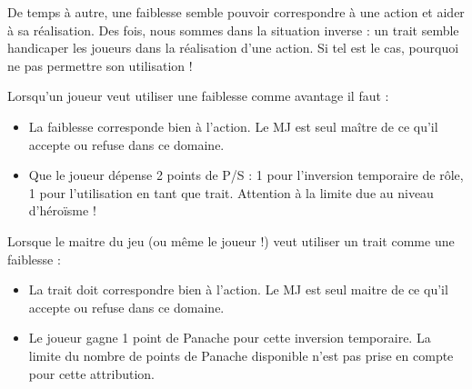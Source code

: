 {
    De temps à autre, une faiblesse semble pouvoir correspondre à une action et aider à sa réalisation. Des fois, nous sommes dans la situation inverse : un trait semble handicaper les joueurs dans la réalisation d'une action. Si tel est le cas, pourquoi ne pas permettre son utilisation !
	
	Lorsqu'un joueur veut utiliser une faiblesse comme avantage il faut :
	\begin{itemize}
		\item La faiblesse corresponde bien à l'action. Le MJ est seul maître de ce qu'il accepte ou refuse dans ce domaine.
		\item Que le joueur dépense 2 points de P/S : 1 pour l'inversion temporaire de rôle, 1 pour l'utilisation en tant que trait. Attention à la limite due au niveau d'héroïsme !
	\end{itemize}
	
	Lorsque le maitre du jeu (ou même le joueur !) veut utiliser un trait comme une faiblesse :
	\begin{itemize}
		\item La trait doit correspondre bien à l'action. Le MJ est seul maitre de ce qu'il accepte ou refuse dans ce domaine.
		\item Le joueur gagne 1 point de Panache pour cette inversion temporaire. La limite du nombre de points de Panache disponible n'est pas prise en compte pour cette attribution.
	\end{itemize}
}



